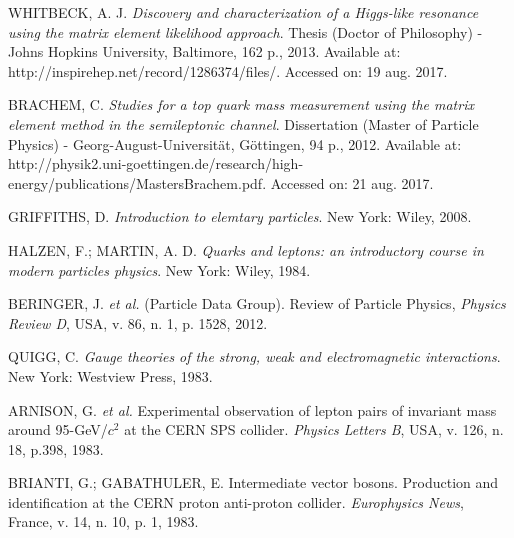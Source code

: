 

\begin{thebibliography}{}
\justifying

WHITBECK, A. J. \textit{Discovery and characterization of a Higgs-like resonance using the matrix element likelihood approach}. Thesis (Doctor of Philosophy) - Johns Hopkins University, Baltimore, 162 p., 2013. Available at: http://inspirehep.net/record/1286374/files/. Accessed on: 19 aug. 2017.

BRACHEM, C. \textit{Studies for a top quark mass measurement using the matrix element method in the semileptonic channel}. Dissertation (Master of Particle Physics) - Georg-August-Universität, Göttingen, 94 p., 2012. Available at: http://physik2.uni-goettingen.de/research/high-energy/publications/MastersBrachem.pdf. Accessed on: 21 aug. 2017.

GRIFFITHS, D. \textit{Introduction to elemtary particles}. New York: Wiley, 2008.

HALZEN, F.; MARTIN, A. D. \textit{Quarks and leptons: an introductory course in modern particles physics}. New York: Wiley, 1984.

BERINGER, J. \textit{et al.} (Particle Data Group). Review of Particle Physics, \textit{Physics Review D}, USA, v. 86, n. 1, p. 1528, 2012.

QUIGG, C. \textit{Gauge theories of the strong, weak and electromagnetic interactions}. New York: Westview Press, 1983.

ARNISON, G. \textit{et al.} Experimental observation of lepton pairs of invariant mass around 95-GeV/$c^2$ at the CERN SPS collider. \textit{Physics Letters B}, USA, v. 126, n. 18, p.398, 1983.

BRIANTI, G.; GABATHULER, E. Intermediate vector bosons. Production and identification at the CERN proton anti-proton collider. \textit{Europhysics News}, France, v. 14, n. 10, p. 1, 1983.


\end{thebibliography}
